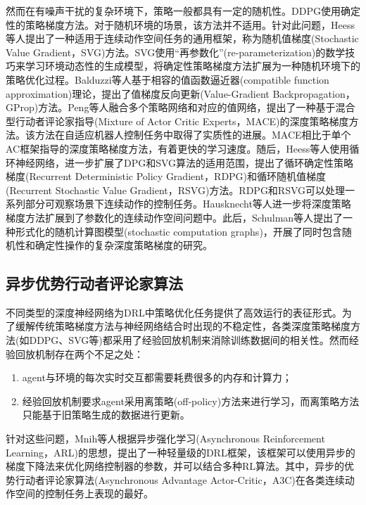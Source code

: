 \documentclass[bachelor]{thesis-uestc}
\begin{document}
	然而在有噪声干扰的复杂环境下，策略一般都具有一定的随机性。DDPG使用确定性的策略梯度方法。对于随机环境的场景，该方法并不适用。针对此问题，Heess等人\cite{heess2015learning}提出了一种适用于连续动作空间任务的通用框架，称为随机值梯度(Stochastic Value Gradient，SVG)方法。SVG使用“再参数化”(re-parameterization)的数学技巧来学习环境动态性的生成模型，将确定性策略梯度方法扩展为一种随机环境下的策略优化过程。Balduzzi等人\cite{balduzzi2015compatible}基于相容的值函数逼近器(compatible function approximation)理论，提出了值梯度反向更新(Value-Gradient Backpropagation，GProp)方法。Peng等人\cite{peng2016terrain}融合多个策略网络和对应的值网络，提出了一种基于混合型行动者评论家指导(Mixture of Actor Critic Experts，MACE)的深度策略梯度方法。该方法在自适应机器人控制任务中取得了实质性的进展。MACE相比于单个AC框架指导的深度策略梯度方法，有着更快的学习速度。随后，Heess等人\cite{heess2015memory}使用循环神经网络，进一步扩展了DPG和SVG算法的适用范围，提出了循环确定性策略梯度(Recurrent Deterministic Policy Gradient，RDPG)和循环随机值梯度(Recurrent Stochastic Value Gradient，RSVG)方法。RDPG和RSVG可以处理一系列部分可观察场景下连续动作的控制任务。Hausknecht等人\cite{hausknecht2015deep}进一步将深度策略梯度方法扩展到了参数化的连续动作空间问题中。此后，Schulman等人\cite{schulman2015gradient}提出了一种形式化的随机计算图模型(stochastic computation graphs)，开展了同时包含随机性和确定性操作的复杂深度策略梯度的研究。
	
	\subsection{异步优势行动者评论家算法}
	不同类型的深度神经网络为DRL中策略优化任务提供了高效运行的表征形式。为了缓解传统策略梯度方法与神经网络结合时出现的不稳定性，各类深度策略梯度方法(如DDPG、SVG等)都采用了经验回放机制来消除训练数据间的相关性。然而经验回放机制存在两个不足之处：
	\begin{enumerate}
		\item agent与环境的每次实时交互都需要耗费很多的内存和计算力；
		\item 经验回放机制要求agent采用离策略(off-policy)方法来进行学习，而离策略方法只能基于旧策略生成的数据进行更新。
	\end{enumerate}
	针对这些问题，Mnih等人\cite{mnih2016asynchronous}根据异步强化学习(Asynchronous Reinforcement Learning，ARL)的思想，提出了一种轻量级的DRL框架，该框架可以使用异步的梯度下降法来优化网络控制器的参数，并可以结合多种RL算法。其中，异步的优势行动者评论家算法(Asynchronous Advantage Actor-Critic，A3C)在各类连续动作空间的控制任务上表现的最好。
	
\end{document}
